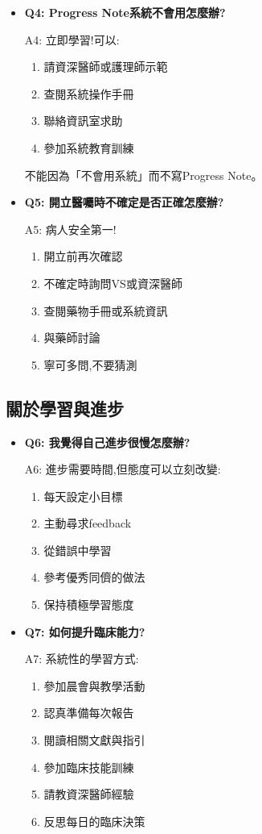 \documentclass[12pt,a4paper]{article}
\begin{document}
\begin{itemize}[leftmargin=*]
\item \textbf{Q4: Progress Note系統不會用怎麼辦?}

A4: 立即學習!可以:
\begin{enumerate}
\item 請資深醫師或護理師示範
\item 查閱系統操作手冊
\item 聯絡資訊室求助
\item 參加系統教育訓練
\end{enumerate}
不能因為「不會用系統」而不寫Progress Note。

\item \textbf{Q5: 開立醫囑時不確定是否正確怎麼辦?}

A5: 病人安全第一!
\begin{enumerate}
\item 開立前再次確認
\item 不確定時詢問VS或資深醫師
\item 查閱藥物手冊或系統資訊
\item 與藥師討論
\item 寧可多問,不要猜測
\end{enumerate}
\end{itemize}

\subsection{關於學習與進步}

\begin{itemize}[leftmargin=*]
\item \textbf{Q6: 我覺得自己進步很慢怎麼辦?}

A6: 進步需要時間,但態度可以立刻改變:
\begin{enumerate}
\item 每天設定小目標
\item 主動尋求feedback
\item 從錯誤中學習
\item 參考優秀同儕的做法
\item 保持積極學習態度
\end{enumerate}

\item \textbf{Q7: 如何提升臨床能力?}

A7: 系統性的學習方式:
\begin{enumerate}
\item 參加晨會與教學活動
\item 認真準備每次報告
\item 閱讀相關文獻與指引
\item 參加臨床技能訓練
\item 請教資深醫師經驗
\item 反思每日的臨床決策
\end{enumerate}
\end{itemize}
\end{document}
